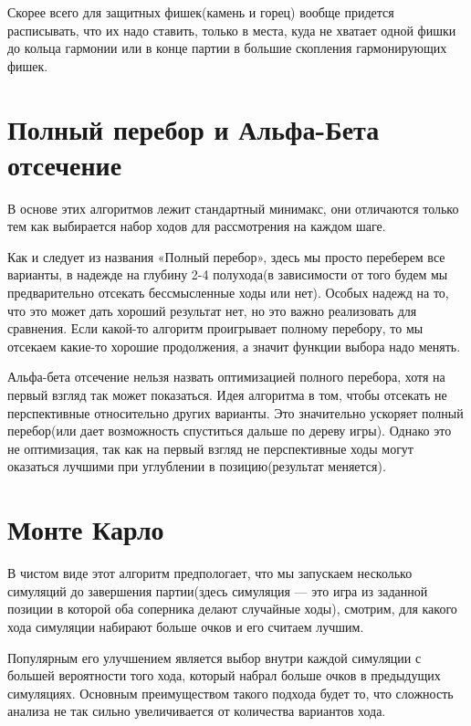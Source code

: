 \documentclass[a4paper,12pt]{diplom}
\begin{document}
Скорее всего для защитных фишек(камень и горец) вообще придется расписывать, что их надо ставить, только в места, куда не хватает одной фишки до кольца гармонии или в конце партии в большие скопления гармонирующих фишек.

\section{Полный перебор и Альфа-Бета отсечение}

В основе этих алгоритмов лежит стандартный минимакс, они отличаются только тем как выбирается набор ходов для рассмотрения на каждом шаге.

Как и следует из названия «Полный перебор», здесь мы просто переберем все варианты, в надежде на глубину 2-4 полухода(в зависимости от того будем мы предварительно отсекать бессмысленные ходы или нет). Особых надежд на то, что это может дать хороший результат нет, но это важно реализовать для сравнения. Если какой-то алгоритм проигрывает полному перебору, то мы отсекаем какие-то хорошие продолжения, а значит функции выбора надо менять.

Альфа-бета отсечение нельзя назвать оптимизацией полного перебора, хотя на первый взгляд так может показаться. Идея алгоритма в том, чтобы отсекать не перспективные относительно других варианты. Это значительно ускоряет полный перебор(или дает возможность спуститься дальше по дереву игры). Однако это не оптимизация, так как на первый взгляд не перспективные ходы могут оказаться  лучшими при углублении в позицию(результат меняется).

\section{Монте Карло}

В чистом виде этот алгоритм предпологает, что мы запускаем несколько симуляций до завершения партии(здесь симуляция — это игра из заданной позиции в которой оба соперника делают случайные ходы), смотрим, для какого хода симуляции набирают больше очков и его считаем лучшим.

Популярным его улучшением является выбор внутри каждой симуляции с большей вероятности того хода, который набрал больше очков в предыдущих симуляциях. Основным преимуществом такого подхода будет то, что сложность анализа не так сильно увеличивается от количества вариантов хода.
\end{document}
